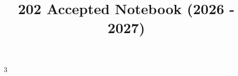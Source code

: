 \documentclass[a4paper, 10pt]{article}
\title{\vspace{-4ex}\Large{202 Accepted Notebook (2026 - 2027)}}
\author{}
\date{}
\theoremstyle{definition}                      %
\begin{document}
\begin{landscape}
\begin{multicols}{3}

\maketitle
\vspace{-13ex}
\tableofcontents
\pagestyle{fancy}



\end{multicols}
\end{landscape}
\end{document}
